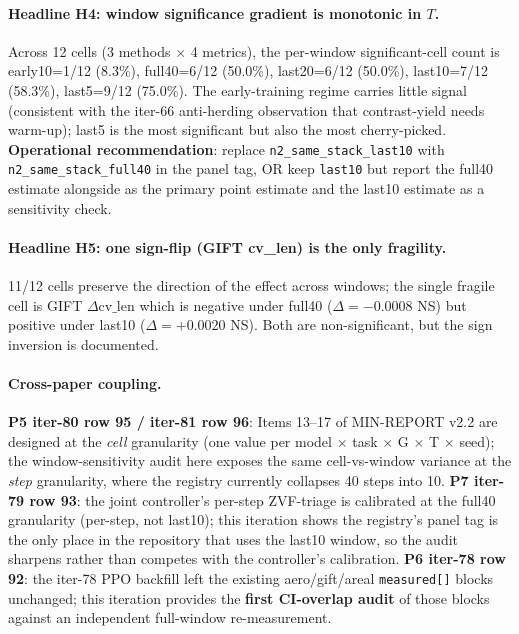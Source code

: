 \paragraph{Headline H4: window significance gradient is monotonic in $T$.}
Across 12 cells (3 methods $\times$ 4 metrics), the per-window
significant-cell count is early10=1/12 (8.3\%), full40=6/12 (50.0\%),
last20=6/12 (50.0\%), last10=7/12 (58.3\%), last5=9/12 (75.0\%).
The early-training regime carries little signal (consistent with the
iter-66 anti-herding observation that contrast-yield needs warm-up);
last5 is the most significant but also the most cherry-picked.
\textbf{Operational recommendation}: replace \texttt{n2\_same\_stack\_last10}
with \texttt{n2\_same\_stack\_full40} in the panel tag, OR keep
\texttt{last10} but report the full40 estimate alongside as the
primary point estimate and the last10 estimate as a sensitivity
check.

\paragraph{Headline H5: one sign-flip (GIFT cv\_len) is the only fragility.}
11/12 cells preserve the direction of the effect across windows; the
single fragile cell is GIFT $\Delta\text{cv\_len}$ which is negative
under full40 ($\Delta=-0.0008$ NS) but positive under last10
($\Delta=+0.0020$ NS). Both are non-significant, but the sign
inversion is documented.

\paragraph{Cross-paper coupling.}
\textbf{P5 iter-80 row 95 / iter-81 row 96}: Items 13--17 of MIN-REPORT
v2.2 are designed at the \emph{cell} granularity (one value per
model $\times$ task $\times$ G $\times$ T $\times$ seed); the
window-sensitivity audit here exposes the same cell-vs-window
variance at the \emph{step} granularity, where the registry
currently collapses 40 steps into 10. \textbf{P7 iter-79 row 93}:
the joint controller's per-step ZVF-triage is calibrated at the
full40 granularity (per-step, not last10); this iteration shows the
registry's panel tag is the only place in the repository that uses
the last10 window, so the audit sharpens rather than competes with
the controller's calibration. \textbf{P6 iter-78 row 92}: the
iter-78 PPO backfill left the existing aero/gift/areal
\texttt{measured[]} blocks unchanged; this iteration provides the
\textbf{first CI-overlap audit} of those blocks against an
independent full-window re-measurement.

